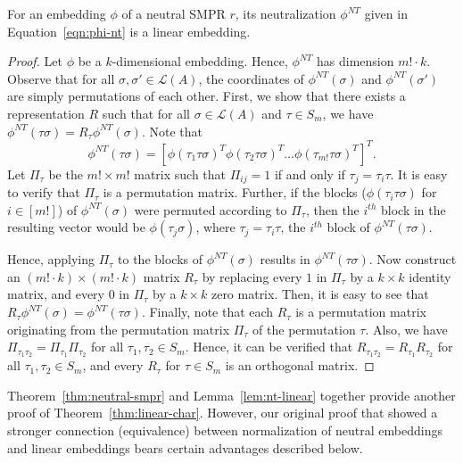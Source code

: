 \documentclass[prodmode,acmec]{ec-acmsmall}
\newcommand{\calL}{{\mathcal{L}}}
\newcommand{\rank}{{\calL(A)}}
\newcommand{\nt}{NT}
\begin{document}
\begin{lemma}
For an embedding $\phi$ of a neutral SMPR $r$, its neutralization $\phi^{\nt}$ given in Equation~\eqref{eqn:phi-nt} is a linear embedding.
\label{lem:nt-linear}
\end{lemma}
\begin{proof}
Let $\phi$ be a $k$-dimensional embedding. Hence, $\phi^{\nt}$ has dimension $m! \cdot k$. Observe that for all $\sigma,\sigma' \in \rank$, the coordinates of $\phi^{\nt}(\sigma)$ and $\phi^{\nt}(\sigma')$ are simply permutations of each other. First, we show that there exists a representation $R$ such that for all $\sigma \in \rank$ and $\tau \in S_m$, we have $\phi^{\nt}(\tau \sigma) = R_{\tau}\phi^{\nt}(\sigma)$. Note that 
$$
\phi^{\nt}(\tau \sigma) = [\phi(\tau_1 \tau \sigma)^T \phi(\tau_2 \tau \sigma)^T \ldots \phi(\tau_{m!} \tau \sigma)^T]^T.
$$
Let $\Pi_{\tau}$ be the $m! \times m!$ matrix such that $\Pi_{ij} = 1$ if and only if $\tau_j = \tau_i \tau$. It is easy to verify that $\Pi_{\tau}$ is a permutation matrix. Further, if the blocks ($\phi(\tau_i \tau \sigma)$ for $i \in [m!]$) of $\phi^{\nt}(\sigma)$ were permuted according to $\Pi_{\tau}$, then the $i^{th}$ block in the resulting vector would be $\phi(\tau_j \sigma)$, where $\tau_j = \tau_i \tau$, the $i^{th}$ block of $\phi^{\nt}(\tau \sigma)$. 

Hence, applying $\Pi_{\tau}$ to the blocks of $\phi^{\nt}(\sigma)$ results in $\phi^{\nt}(\tau \sigma)$. Now construct an $(m! \cdot k) \times (m! \cdot k)$ matrix $R_{\tau}$ by replacing every $1$ in $\Pi_{\tau}$ by a $k\times k$ identity matrix, and every $0$ in $\Pi_{\tau}$ by a $k\times k$ zero matrix. Then, it is easy to see that $R_{\tau} \phi^{\nt}(\sigma) = \phi^{\nt}(\tau \sigma)$. Finally, note that each $R_{\tau}$ is a permutation matrix originating from the permutation matrix $\Pi_{\tau}$ of the permutation $\tau$. Also, we have $\Pi_{\tau_1 \tau_2} = \Pi_{\tau_1} \Pi_{\tau_2}$ for all $\tau_1,\tau_2 \in S_m$. Hence, it can be verified that $R_{\tau_1 \tau_2} = R_{\tau_1} R_{\tau_2}$ for all $\tau_1,\tau_2 \in S_m$, and every $R_{\tau}$ for $\tau \in S_m$ is an orthogonal matrix.
\end{proof}

Theorem~\ref{thm:neutral-smpr} and Lemma~\ref{lem:nt-linear} together provide another proof of Theorem~\ref{thm:linear-char}. However, our original proof that showed a stronger connection (equivalence) between normalization of neutral embeddings and linear embeddings bears certain advantages described below.
\end{document}
